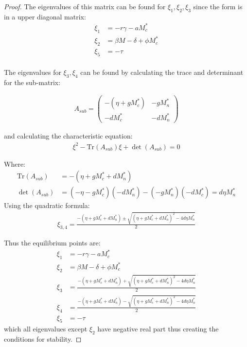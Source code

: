 \documentclass[11pt]{article}
\theoremstyle{definition}
\begin{document}
\begin{proof}
\noindent The eigenvalues of this matrix can be found for $\xi_1, \xi_2, \xi_3$ since the form is in a upper diagonal matrix:
\begin{align*}
\xi_1 &= -r\gamma - aM_c^*\\
\xi_2 &= \beta M - \delta + \phi M_c^*\\
\xi_5 &= -\tau\\
\end{align*}

\noindent The eigenvalues for $\xi_3, \xi_4$ can be found by calculating the trace and determinant for the sub-matrix:

\begin{align*}
A_{sub} = \begin{pmatrix}
-(\eta + g M_c^*) & -g M_n^* \\
-d M_c^* & -d M_n^*
\end{pmatrix}
\end{align*}

\noindent and calculating the characteristic equation:
\begin{align*}
  \xi^2 - \text{Tr}(A_{sub})\xi + \det(A_{sub}) = 0
\end{align*}

\noindent Where:
\begin{align*}
\text{Tr}(A_{sub}) &= -(\eta + g M_c^* + d M_n^*)\\
\det(A_{sub}) &= (-\eta - g M_c^*)(-d M_n^*) - (-g M_n^*)(-d M_c^*) = d\eta M_n^*
\end{align*}
\noindent Using the quadratic formula:
\begin{align*}
\xi_{3,4} = \frac{-(\eta + g M_c^* + d M_n^*) \pm \sqrt{(\eta + g M_c^* + d M_n^*)^2 - 4d\eta M_n^*}}{2}
\end{align*}

\noindent Thus the equilibrium points are: 
\begin{align*}
\xi_1 &= -r\gamma - aM_c^*\\
\xi_2 &= \beta M - \delta + \phi M_c^*\\
\xi_3 &= \frac{-(\eta + g M_c^* + d M_n^*) + \sqrt{(\eta + g M_c^* + d M_n^*)^2 - 4d\eta M_n^*}}{2}\\
\xi_4 &= \frac{-(\eta + g M_c^* + d M_n^*) - \sqrt{(\eta + g M_c^* + d M_n^*)^2 - 4d\eta M_n^*}}{2}\\
\xi_5 &= -\tau
\end{align*}
\noindent which all eigenvalues except $\xi_2$ have negative real part thus creating the conditions for stability. 
\end{proof}
\end{document}
